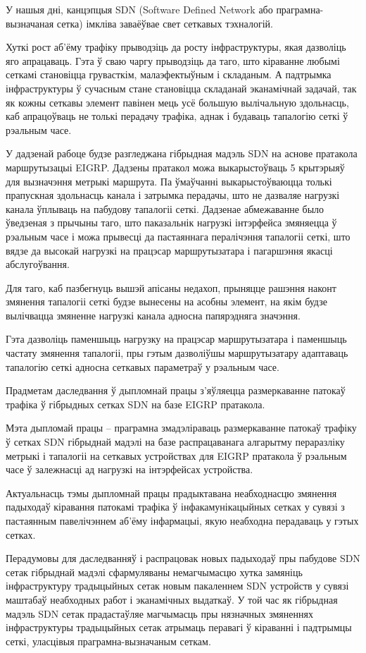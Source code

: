 \sectionWithoutNumber{\prefacename}

У нашыя дні, канцэпцыя SDN (Software Defined Network або праграмна-вызначаная сетка)
імкліва заваёўвае свет сеткавых тэхналогій.

Хуткі рост аб'ёму трафіку прыводзіць да росту інфраструктуры, якая
дазволіць яго апрацаваць. Гэта ў сваю чаргу прыводзіць да таго, што кіраванне
любымі сеткамі становіцца грувасткім, малаэфектыўным і складаным.
А падтрымка інфраструктуры ў сучасным стане становіцца складанай эканамічнай задачай,
так як кожны сеткавы элемент павінен мець усё большую вылічальную здольнасць, каб
апрацоўваць не толькі перадачу трафіка, аднак і будаваць тапалогію сеткі ў рэальным часе.

У дадзенай рабоце будзе разгледжана гібрыдная мадэль
SDN на аснове пратакола маршрутызацыі EIGRP.
Дадзены пратакол можа выкарыстоўваць 5 крытэрыяў для вызначэння метрыкі маршрута.
Па ўмаўчанні выкарыстоўваюцца толькі прапускная здольнасць канала і затрымка перадачы,
што не дазваляе нагрузкі канала ўплываць на пабудову тапалогіі сеткі.
Дадзенае абмежаванне было ўведзеная з прычыны таго, што паказальнік нагрузкі інтэрфейса
змяняецца ў рэальным часе і можа прывесці да пастаяннага пералічэння тапалогіі сеткі, што
вядзе да высокай нагрузкі на працэсар маршрутызатара і пагаршэння якасці абслугоўвання.

Для таго, каб пазбегнуць вышэй апісаны недахоп, прыняцце рашэння наконт змянення тапалогіі сеткі
будзе вынесены на асобны элемент, на якім будзе вылічвацца змяненне нагрузкі канала адносна
папярэдняга значэння.

Гэта дазволіць паменшыць нагрузку на працэсар маршрутызатара і паменшыць частату змянення
тапалогіі, пры гэтым дазволіўшы маршрутызатару адаптаваць тапалогію сеткі адносна сеткавых параметраў
у рэальным часе.

Прадметам даследвання ў дыпломнай працы з'яўляецца размеркаванне патокаў трафіка ў гібрыдных сетках SDN на базе EIGRP пратакола.

Мэта дыпломай працы -- праграмна змадэліраваць размеркаванне
патокаў трафіку ў сетках SDN гібрыднай мадэлі на базе распрацаванага алгарытму пераразліку метрыкі
і тапалогіі на сеткавых устройствах для EIGRP пратакола ў рэальным часе
ў залежнасці ад нагрузкі на інтэрфейсах устройства.

Актуальнасць тэмы дыпломнай працы прадыктавана неабходнасцю
змянення падыходаў кіравання патокамі трафіка ў інфакамунікацыйных сетках
у сувязі з пастаянным павелічэннем аб'ёму інфармацыі, якую неабходна
перадаваць у гэтых сетках.

Перадумовы для даследванняў і распрацовак новых падыходаў пры пабудове
SDN сетак гібрыднай мадэлі сфармуляваны немагчымасцю хутка замяніць
інфраструктуру традыцыйных сетак новым пакаленнем SDN устройств у сувязі маштабаў неабходных
работ і эканамічных выдаткаў. У той час як гібрыдная мадэль SDN сетак
прадастаўляе магчымасць пры нязначных змяненнях інфраструктуры традыцыйных сетак атрымаць перавагі ў кіраванні і падтрымцы сеткі, уласцівыя праграмна-вызначаным сеткам.


\clearpage
